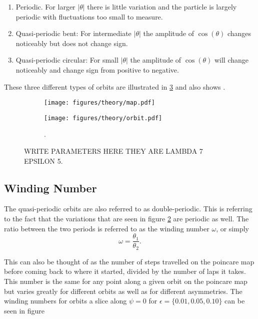 \begin{enumerate}
\item Periodic. For larger $\left|\theta\right|$ there is little variation and the particle is largely periodic with fluctuations too small to measure.
\item Quasi-periodic bent: For intermediate $\left|\theta\right|$ the amplitude of $\cos(\theta)$ changes noticeably but does not change sign.
\item Quasi-periodic circular: For small $\left|\theta\right|$ the amplitude of $\cos(\theta)$ will change noticeably and change sign from positive to negative.
\end{enumerate}

These three different types of orbits are illustrated in \ref{fig:orbittypes} and also shows .

\begin{figure}[H]
\centering
\begin{subfigure}[3a]{0.40\textwidth}
\texttt{[image: figures/theory/map.pdf]}
\caption{}\label{fig:orbitmap}
\end{subfigure}\hspace{1em}%
\begin{subfigure}[3b]{0.40\textwidth}
\texttt{[image: figures/theory/orbit.pdf]}
\caption{.}\label{fig:orbitparams}
\end{subfigure}
\caption{WRITE PARAMETERS HERE THEY ARE LAMBDA 7 EPSILON 5.}
\label{fig:orbittypes}
\end{figure}

\subsection{Winding Number}
The quasi-periodic orbits are also referred to as double-periodic. This is referring to the fact that the variations that are seen in figure \ref{fig:orbitparams} are periodic as well. The ratio between the two periods is referred to as the winding number $\omega$, or simply
\begin{equation}\label{eq:winding}
\omega = \frac{\theta_1}{\theta_2}.
\end{equation}

This can also be thought of as the number of steps travelled on the poincare map before coming back to where it 
started, divided by the number of laps it takes. This number is the same for any point along a given orbit on the 
poincare map but varies greatly for different orbits as well as for different asymmetries. The winding numbers for
 orbits a slice along $\psi=0$ for $\epsilon=\{0.01, 0.05, 0.10\}$ can be seen in figure 
 
